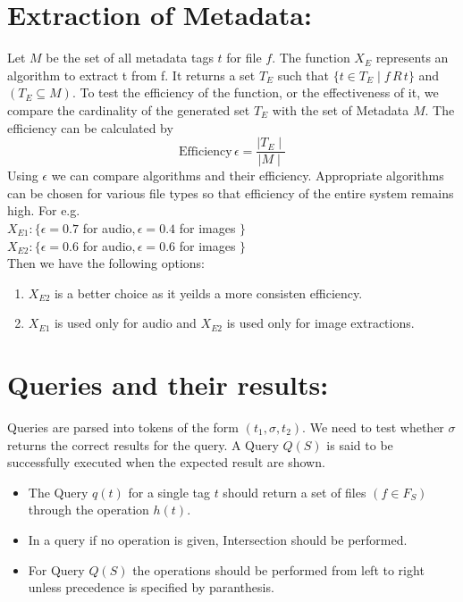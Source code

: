 \section{Extraction of Metadata:}
Let $M$ be the set of all metadata tags $t$ for file $f$. The function $X_{E}$ represents an algorithm to extract t from f. It returns a set $T_{E}$ such that $\{t \in T_{E} \mid f \, R \, t\}$ and $(T_E \subseteq M)$. To test the efficiency of the function, or the effectiveness of it, we compare the cardinality of the generated set $T_E$ with the set of Metadata $M$. The efficiency can be calculated by
$$\mathrm{Efficiency} \, \epsilon = \frac {\mid T_E \mid} {\mid M \mid}$$
Using $\epsilon$ we can compare algorithms and their efficiency. Appropriate algorithms can be chosen for various file types so that efficiency of the entire system remains high. For e.g. \\
\indent $X_{E1} : \{\epsilon =0.7$ for audio$, \epsilon = 0.4$ for images $\}$ \\
\indent $X_{E2} : \{\epsilon =0.6$ for audio$, \epsilon = 0.6$ for images $\}$ \\
Then we have the following options:
\begin{enumerate}
\item $X_{E2}$ is a better choice as it yeilds a more consisten efficiency.
\item $X_{E1}$ is used only for audio and $X_{E2}$ is used only for image extractions.
\end{enumerate}


\section{Queries and their results:}
Queries are parsed into tokens of the form $(t_1, \sigma , t_2)$. We need to test whether $\sigma $ returns the correct results for the query. A Query $Q(S)$ is said to be successfully executed when the expected result are shown.  
\begin{itemize}
\item The Query $q(t)$ for a single tag $t$ should return a set of files $(f \in F_{S})$ through the operation $h(t)$. 
\item In a query if no operation is given, Intersection should be performed. 
\item For Query $Q(S)$ the operations should be performed from left to right unless precedence is specified by paranthesis. 
\end{itemize}

